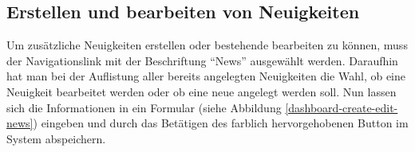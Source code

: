 
\clearpage

\subsection{Erstellen und bearbeiten von Neuigkeiten}
Um zusätzliche Neuigkeiten erstellen oder bestehende bearbeiten zu können, muss der Navigationslink mit der Beschriftung \enquote{News} ausgewählt werden. Daraufhin hat man bei der Auflistung aller bereits angelegten Neuigkeiten die Wahl, ob eine Neuigkeit bearbeitet werden oder ob eine neue angelegt werden soll. Nun lassen sich die Informationen in ein Formular (siehe Abbildung \ref{dashboard-create-edit-news}) eingeben und durch das Betätigen des farblich hervorgehobenen Button im System abspeichern.

